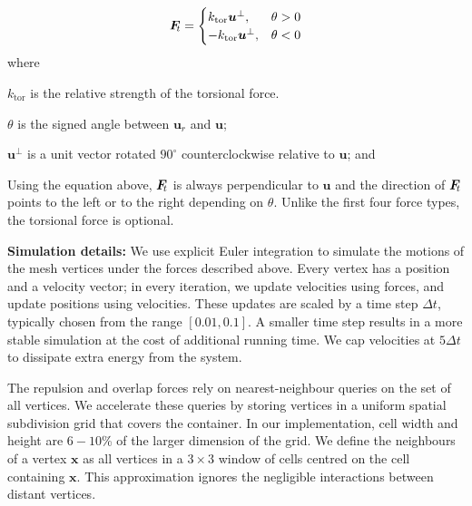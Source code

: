 \begin{equation}
  \simforce{t} =\begin{cases}
    k_\mathrm{tor}\bm{u}^\perp, & \theta > 0\\
    -k_\mathrm{tor}\bm{u}^\perp, & \theta < 0
  \end{cases}
\end{equation}
where
\begin{packeddescriptions}
	\item[$k_\mathrm{tor}$]  is the relative strength of the torsional force.
	\item[$\theta$] is the signed angle between $\bm{u}_r$ and $\bm{u}$;
	\item[$\bm{u}^\perp$] is a unit vector rotated $90^\circ$
		counterclockwise relative to $\bm{u}$; and
\end{packeddescriptions}

Using the equation above, $\simforce{t}$ is always perpendicular to $\bm{u}$
and the direction of $\simforce{t}$ points to the left or to the right depending on $\theta$.
Unlike the first four force types, the torsional force is optional.


\medskip
\textbf{Simulation details:} 
We use explicit Euler integration to simulate the motions of the mesh vertices under the
forces described above.  Every vertex has a position and a velocity vector; in
every iteration, we update velocities using forces, and update positions using
velocities.  These updates are scaled by a time step $\Delta t$, typically
chosen from the range $[0.01,0.1]$.  A smaller time step results in a more
stable simulation at the cost of additional running time.  We cap velocities
at $5\Delta t$ to dissipate extra energy from the system.


The repulsion and overlap forces rely on nearest-neighbour queries on the
set of all vertices.  We accelerate these queries by storing vertices in a
uniform spatial subdivision grid that covers the container.  In our
implementation, cell width and height are $6-10$\% of the larger dimension
of the grid.  
We define the neighbours of a vertex $\bm{x}$ as
all vertices in a $3\times 3$ window of cells centred on the cell
containing $\bm{x}$. 
This approximation ignores the negligible interactions between
distant vertices.


